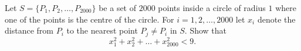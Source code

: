 Let $S=\{P_1,P_2,\ldots,P_{2000}\}$ be a set of $2000$ points inside a circle of radius $1$
where one of the points is the centre of the circle.
For $i=1,2,\ldots,2000$ let $x_i$ denote the distance from $P_i$ to the nearest
point $P_j \neq P_i$ in $S$. Show that
$$x_1^2+x_2^2+\ldots+x_{2000}^2 < 9.$$